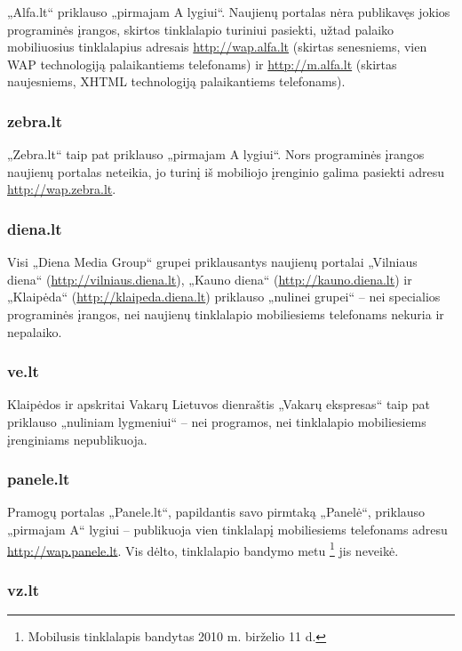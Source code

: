 \documentclass[kursinis-darbas]{vukf}
\begin{document}
„Alfa.lt“ priklauso „pirmajam A lygiui“. Naujienų portalas nėra publikavęs jokios programinės įrangos, skirtos tinklalapio turiniui pasiekti, užtad palaiko mobiliuosius tinklalapius adresais \url{http://wap.alfa.lt} (skirtas senesniems, vien WAP technologiją palaikantiems telefonams) ir \url{http://m.alfa.lt} (skirtas naujesniems, XHTML technologiją palaikantiems telefonams).

\subsubsection{zebra.lt}

„Zebra.lt“ taip pat priklauso „pirmajam A lygiui“. Nors programinės įrangos naujienų portalas neteikia, jo turinį iš mobiliojo įrenginio galima pasiekti adresu \url{http://wap.zebra.lt}.

\subsubsection{diena.lt}

Visi „Diena Media Group“ grupei priklausantys naujienų portalai „Vilniaus diena“ (\url{http://vilniaus.diena.lt}), „Kauno diena“ (\url{http://kauno.diena.lt}) ir „Klaipėda“ (\url{http://klaipeda.diena.lt}) priklauso „nulinei grupei“ – nei specialios programinės įrangos, nei naujienų tinklalapio mobiliesiems telefonams nekuria ir nepalaiko.

\subsubsection{ve.lt}

Klaipėdos ir apskritai Vakarų Lietuvos dienraštis „Vakarų ekspresas“ taip pat priklauso „nuliniam lygmeniui“ – nei programos, nei tinklalapio mobiliesiems įrenginiams nepublikuoja.

\subsubsection{panele.lt}

Pramogų portalas „Panele.lt“, papildantis savo pirmtaką „Panelė“, priklauso „pirmajam A“ lygiui – publikuoja vien tinklalapį mobiliesiems telefonams adresu \url{http://wap.panele.lt}. Vis dėlto, tinklalapio bandymo metu \footnote{Mobilusis tinklalapis bandytas 2010 m. birželio 11 d.} jis neveikė.

\subsubsection{vz.lt}
\end{document}
